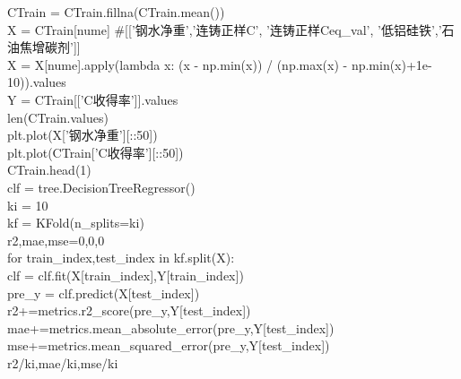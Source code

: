 \documentclass{xcumcmart}
\begin{document}
CTrain = CTrain.fillna(CTrain.mean())  \\
X = CTrain[nume] \#[['钢水净重','连铸正样C', '连铸正样Ceq\_val', '低铝硅铁','石油焦增碳剂']]  \\
X = X[nume].apply(lambda x: (x - np.min(x)) / (np.max(x) - np.min(x)+1e-10)).values  \\
Y = CTrain[['C收得率']].values  \\
len(CTrain.values)  \\
plt.plot(X['钢水净重'][::50])  \\
plt.plot(CTrain['C收得率'][::50])  \\
CTrain.head(1)  \\
clf = tree.DecisionTreeRegressor()   \\
ki = 10  \\
kf = KFold(n\_splits=ki)  \\
r2,mae,mse=0,0,0  \\
for train\_index,test\_index in kf.split(X):  \\
    clf = clf.fit(X[train\_index],Y[train\_index])  \\
    pre\_y = clf.predict(X[test\_index])  \\
    r2+=metrics.r2\_score(pre\_y,Y[test\_index])  \\
    mae+=metrics.mean\_absolute\_error(pre\_y,Y[test\_index])  \\
    mse+=metrics.mean\_squared\_error(pre\_y,Y[test\_index])  \\
r2/ki,mae/ki,mse/ki  \\
\end{document}
